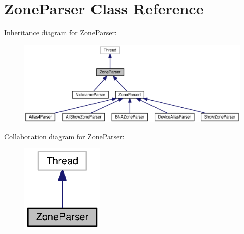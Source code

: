 \section{Zone\-Parser Class Reference}
\label{classorg_1_1smallfoot_1_1parser_1_1zone_1_1ZoneParser}


Inheritance diagram for Zone\-Parser\-:\nopagebreak
\begin{figure}[H]
\begin{center}
\leavevmode
\includegraphics[width=350pt]{classorg_1_1smallfoot_1_1parser_1_1zone_1_1ZoneParser__inherit__graph}
\end{center}
\end{figure}


Collaboration diagram for Zone\-Parser\-:\nopagebreak
\begin{figure}[H]
\begin{center}
\leavevmode
\includegraphics[width=112pt]{classorg_1_1smallfoot_1_1parser_1_1zone_1_1ZoneParser__coll__graph}
\end{center}
\end{figure}
